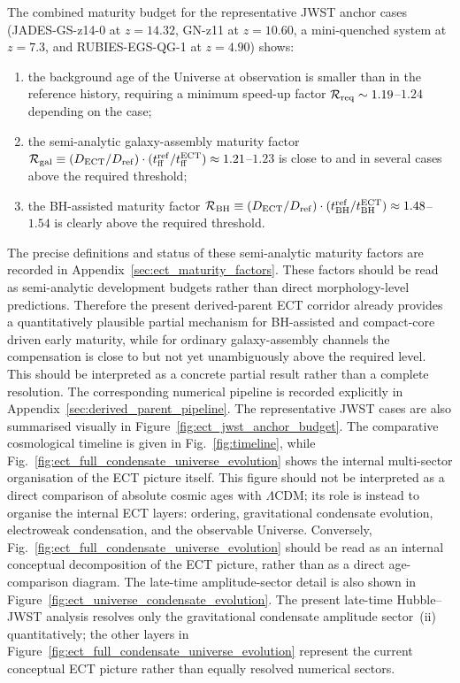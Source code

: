 \documentclass[11pt,a4paper]{article}
\numberwithin{equation}{section}
\begin{document}
The combined maturity budget for the representative JWST anchor cases
(JADES-GS-z14-0 at $z=14.32$, GN-z11 at $z=10.60$, a mini-quenched
system at $z=7.3$, and RUBIES-EGS-QG-1 at $z=4.90$) shows:
\begin{enumerate}
  \item the background age of the Universe at observation is smaller
  than in the reference history, requiring a minimum speed-up factor
  $\mathcal R_{\rm req}\sim 1.19$--$1.24$ depending on the case;
  \item the semi-analytic galaxy-assembly maturity factor
  $\mathcal R_{\rm gal}\equiv (D_{\rm ECT}/D_{\rm ref})\cdot(t_{\rm ff}^{\rm ref}/t_{\rm ff}^{\rm ECT})\approx 1.21$--$1.23$
  is close to and in several cases above the required threshold;
  \item the BH-assisted maturity factor
  $\mathcal R_{\rm BH}\equiv (D_{\rm ECT}/D_{\rm ref})\cdot(t_{\rm BH}^{\rm ref}/t_{\rm BH}^{\rm ECT})\approx 1.48$--$1.54$
  is clearly above the required threshold.
\end{enumerate}
The precise definitions and status of these semi-analytic maturity
factors are recorded in Appendix~\ref{sec:ect_maturity_factors}.
These factors should be read as semi-analytic development budgets rather
than direct morphology-level predictions.
Therefore the present derived-parent ECT corridor already provides a
quantitatively plausible partial mechanism for BH-assisted and compact-core
driven early maturity, while for ordinary galaxy-assembly channels the
compensation is close to but not yet unambiguously above the required level.
This should be interpreted as a concrete partial result rather than a
complete resolution.
The corresponding numerical pipeline is recorded explicitly in
Appendix~\ref{sec:derived_parent_pipeline}.
The representative JWST cases are also summarised visually in
Figure~\ref{fig:ect_jwst_anchor_budget}.
The comparative cosmological timeline is given in
Fig.~\ref{fig:timeline}, while
Fig.~\ref{fig:ect_full_condensate_universe_evolution} shows the
internal multi-sector organisation of the ECT picture itself.
This figure should not be interpreted as a direct comparison of
absolute cosmic ages with $\Lambda$CDM; its role is instead to
organise the internal ECT layers: ordering, gravitational condensate
evolution, electroweak condensation, and the observable Universe.
Conversely, Fig.~\ref{fig:ect_full_condensate_universe_evolution}
should be read as an internal conceptual decomposition of the ECT
picture, rather than as a direct age-comparison diagram.
The late-time amplitude-sector detail is also shown in
Figure~\ref{fig:ect_universe_condensate_evolution}.
The present late-time Hubble--JWST analysis resolves only the
gravitational condensate amplitude sector~(ii) quantitatively;
the other layers in Figure~\ref{fig:ect_full_condensate_universe_evolution}
represent the current conceptual ECT picture rather than equally
resolved numerical sectors.
\end{document}
